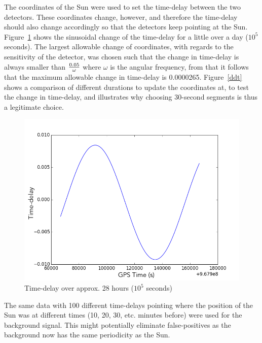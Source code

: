 \par{}
The coordinates of the Sun were used to set the time-delay between the two detectors. These coordinates change, however, and therefore the time-delay should also change accordingly so that the detectors keep pointing at the Sun. Figure~\ref{tdt} shows the sinusoidal change of the time-delay for a little over a day ($10^{5}$ seconds). The largest allowable change of coordinates, with regards to the sensitivity of the detector, was chosen such that the change in time-delay is always smaller than $0.05 \over \omega$ where $\omega$ is the angular frequency, from that it follows that the maximum allowable change in time-delay is 0.0000265. Figure~\ref{ddt} shows a comparison of different durations to update the coordinates at, to test the change in time-delay, and illustrates why choosing 30-second segments is thus a legitimate choice. 
\begin{figure}[htb]
\begin{center}
\includegraphics[width=\textwidth]{t_dt}
\caption{Time-delay over approx. 28 hours ($10^{5}$ seconds)}
\label{tdt}
\end{center}
\end{figure}
\par{} 
The same data with 100 different time-delays pointing where the position of the Sun was at different times (10, 20, 30, etc. minutes before) were used for the background signal. This might potentially eliminate false-positives as the background now has the same periodicity as the Sun.

